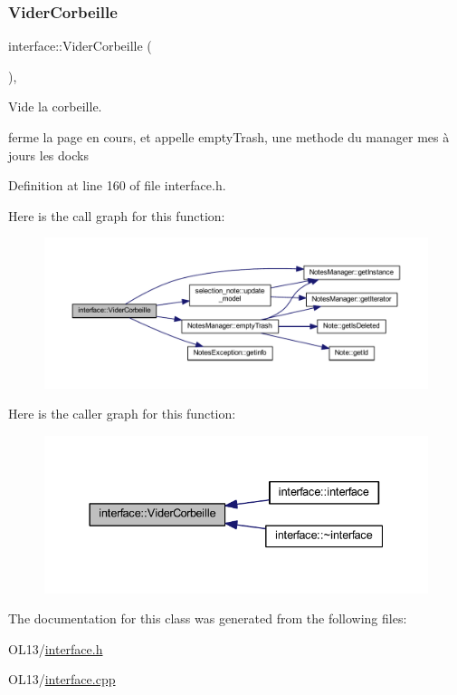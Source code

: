 \subsubsection{\texorpdfstring{Vider\+Corbeille}{ViderCorbeille}}
{\footnotesize\ttfamily interface\+::\+Vider\+Corbeille (\begin{DoxyParamCaption}{ }\end{DoxyParamCaption})\hspace{0.3cm}{\ttfamily [inline]}, {\ttfamily [slot]}}



Vide la corbeille. 

ferme la page en cours, et appelle empty\+Trash, une methode du manager mes à jours les docks 

Definition at line 160 of file interface.\+h.

Here is the call graph for this function\+:\nopagebreak
\begin{figure}[H]
\begin{center}
\leavevmode
\includegraphics[width=350pt]{classinterface_a430ee153cb2ea74b9103081d48cd61f3_cgraph}
\end{center}
\end{figure}
Here is the caller graph for this function\+:\nopagebreak
\begin{figure}[H]
\begin{center}
\leavevmode
\includegraphics[width=337pt]{classinterface_a430ee153cb2ea74b9103081d48cd61f3_icgraph}
\end{center}
\end{figure}


The documentation for this class was generated from the following files\+:\begin{DoxyCompactItemize}
\item 
O\+L13/\hyperlink{interface_8h}{interface.\+h}\item 
O\+L13/\hyperlink{interface_8cpp}{interface.\+cpp}\end{DoxyCompactItemize}
